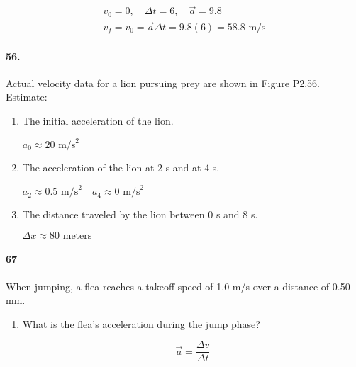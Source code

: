 \begin{multicols*}{2}
        \begin{mdframed}
            \begin{equation*}
                \begin{gathered}
                    v_0 = 0, \quad \Delta t = 6, \quad \vec{a} = 9.8    \\
                    v_f = v_0 = \vec{a}\Delta t = 9.8(6) = \boxed{58.8 \text{ m/s}}
                \end{gathered}
            \end{equation*}
        \end{mdframed}

        \paragraph*{56.}
        Actual velocity data for a lion pursuing prey are shown in Figure P2.56. Estimate:

        \begin{enumerate}[label=\alph*.]
            \item The initial acceleration of the lion. 
            
            $\boxed{a_0 \approx 20 \text{ m/s}^2}$

            \item The acceleration of the lion at 2 s and at 4 s.
            
            $\boxed{a_2 \approx 0.5 \text{ m/s}^2 \quad a_4 \approx 0 \text{ m/s}^2}$

            \item The distance traveled by the lion between 0 s and 8 s.
            
            $\boxed{\Delta x \approx 80 \text { meters}}$
        \end{enumerate}

        \paragraph*{67}
        When jumping, a flea reaches a takeoff speed of 1.0 m/s over a distance of 0.50 mm.

        \begin{enumerate}[label=\alph*.]
            \item What is the flea's acceleration during the jump phase?
            
            \begin{mdframed}
                \begin{equation*}
                    \vec{a} = \frac{\Delta v}{\Delta t}
                \end{equation*}
            \end{mdframed}
        \end{enumerate}

    \end{multicols*}


